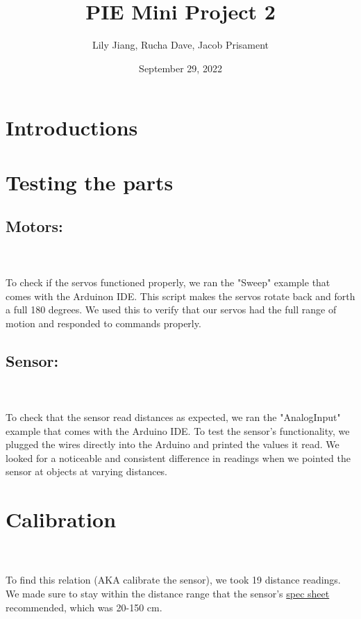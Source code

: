 \documentclass{article}
\title{PIE Mini Project 2}
\author{Lily Jiang, Rucha Dave, Jacob Prisament}
\date{September 29, 2022}
\begin{document}
\maketitle

\section{Introductions}


\section{Testing the parts}

    \subsection{Motors:}
     \\
    \\
    To check if the servos functioned properly, we ran the "Sweep" example that comes with the Arduinon IDE. This script makes the servos rotate back and forth a full 180 degrees. We used this to verify that our servos had the full range of motion and responded to commands properly.

    \subsection{Sensor:}
     \\
    \\
    To check that the sensor read distances as expected, we ran the "AnalogInput" example that comes with the Arduino IDE. To test the sensor's functionality, we plugged the wires directly into the Arduino and printed the values it read. We looked for a noticeable and consistent difference in readings when we pointed the sensor at objects at varying distances. \\

\section{Calibration}
     \\
    \\
    To find this relation (AKA calibrate the sensor), we took 19 distance readings. We made sure to stay within the distance range that the sensor's \href{https://www.sparkfun.com/datasheets/Sensors/Infrared/gp2y0a02yk_e.pdf}{spec sheet} recommended, which was 20-150 cm.
    
\end{document}
